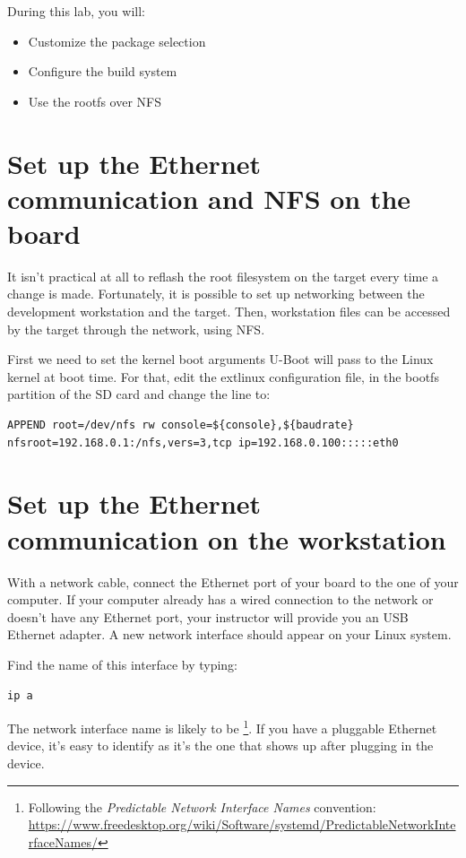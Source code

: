 
During this lab, you will:
\begin{itemize}
  \item Customize the package selection
  \item Configure the build system
  \item Use the rootfs over NFS
\end{itemize}

\section{Set up the Ethernet communication and NFS on the board}

It isn't practical at all to reflash the root filesystem on the target
every time a change is made. Fortunately, it is possible to set up
networking between the development workstation and the target. Then,
workstation files can be accessed by the target through the network,
using NFS.

First we need to set the kernel boot arguments U-Boot will pass to the
Linux kernel at boot time. For that, edit the extlinux configuration file, in
the bootfs partition of the SD card and change the  line to:

{\small
\begin{verbatim}
APPEND root=/dev/nfs rw console=${console},${baudrate} nfsroot=192.168.0.1:/nfs,vers=3,tcp ip=192.168.0.100:::::eth0
\end{verbatim}
}

\section{Set up the Ethernet communication on the workstation}

With a network cable, connect the Ethernet port of your board to the
one of your computer. If your computer already has a wired connection
to the network or doesn't have any Ethernet port, your instructor will
provide you an USB Ethernet adapter. A new network interface should
 appear on your Linux system.

Find the name of this interface by typing:
\begin{verbatim}
ip a
\end{verbatim}

The network interface name is likely to be
\footnote{Following the {\em Predictable Network Interface
Names} convention:
\url{https://www.freedesktop.org/wiki/Software/systemd/PredictableNetworkInterfaceNames/}}.
If you have a pluggable Ethernet device, it's easy to identify as it's
the one that shows up after plugging in the device.

